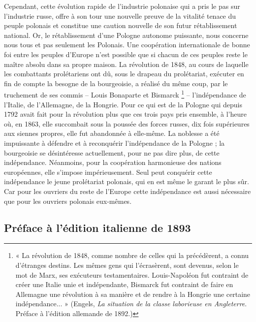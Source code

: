 \documentclass[french,twoside]{book} %
\newcommand{\byline}[1]{\bigskip{\RaggedLeft{#1}\par}\bigskip}
\begin{document}
Cependant, cette évolution rapide de l’industrie polonaise qui a pris le pas sur l’industrie russe, offre à son tour une nouvelle preuve de la vitalité tenace du peuple polonais et constitue une caution nouvelle de son futur rétablissement national. Or, le rétablissement d’une Pologne autonome puissante, nous concerne nous tous et pas seulement les Polonais. Une coopération internationale de bonne foi entre les peuples d’Europe n’est possible que si chacun de ces peuples reste le maître absolu dans sa propre maison. La révolution de 1848, au cours de laquelle les combattants prolétariens ont dû, sous le drapeau du prolétariat, exécuter en fin de compte la besogne de la bourgeoisie, a réalisé du même coup, par le truchement de ses commis – Louis Bonaparte et Bismarck \footnote{« La révolution de 1848, comme nombre de celles qui la précédèrent, a connu d’étranges destins. Les mêmes gens qui l’écrasèrent, sont devenus, selon le mot de Marx, ses exécuteurs testamentaires. Louis-Napoléon fut contraint de créer une Italie unie et indépendante, Bismarck fut contraint de faire en Allemagne une révolution à sa manière et de rendre à la Hongrie une certaine indépendance... » (Engels, \emph{La situation de la classe laborieuse en Angleterre}. Préface à l’édition allemande de 1892.)} – l’indépendance de l’Italie, de l’Allemagne, de la Hongrie. Pour ce qui est de la Pologne qui depuis 1792 avait fait pour la révolution plus que ces trois pays pris ensemble, à l’heure où, en 1863, elle succombait sous la poussée des forces russes, dix fois supérieures aux siennes propres, elle fut abandonnée à elle-même. La noblesse a été impuissante à défendre et à reconquérir l’indépendance de la Pologne ; la bourgeoisie se désintéresse actuellement, pour ne pas dire plus, de cette indépendance. Néanmoins, pour la coopération harmonieuse des nations européennes, elle s’impose impérieusement. Seul peut conquérir cette indépendance le jeune prolétariat polonais, qui en est même le garant le plus sûr. Car pour les ouvriers du reste de l’Europe cette indépendance est aussi nécessaire que pour les ouvriers polonais eux-mêmes.\par

\byline{Friedrich Engels ; \\
Londres, 10 février 1892}
\subsection[Préface à l’édition italienne de 1893]{Préface à l’édition italienne de 1893}
\end{document}
